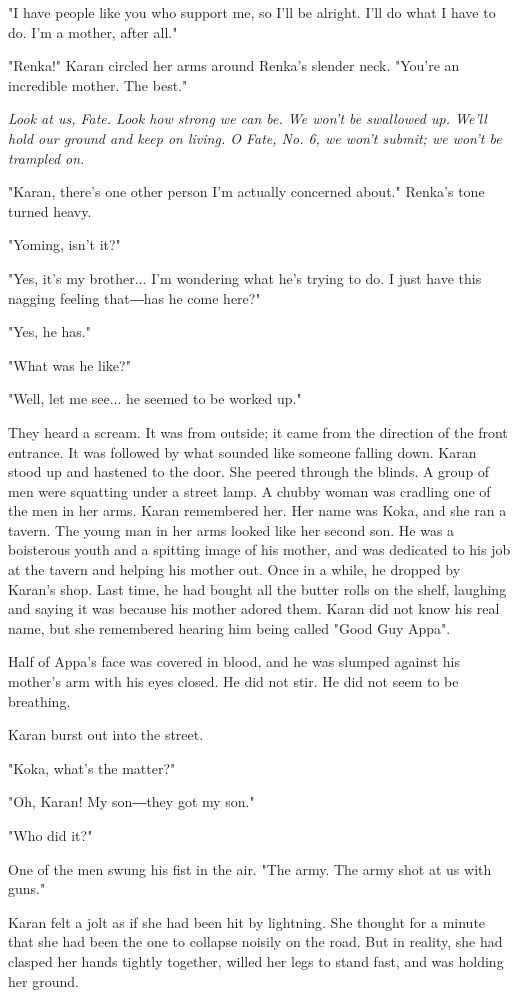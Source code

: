 "I have people like you who support me, so I'll be alright. I'll do what
I have to do. I'm a mother, after all."

"Renka!" Karan circled her arms around Renka's slender neck. "You're an
incredible mother. The best."

\emph{Look at us, Fate. Look how strong we can be. We won't be swallowed up.
	We'll hold our ground and keep on living. O Fate, No. 6, we won't
	submit; we won't be trampled on.}

"Karan, there's one other person I'm actually concerned about." Renka's
tone turned heavy.

"Yoming, isn't it?"

"Yes, it's my brother... I'm wondering what he's trying to do. I just
have this nagging feeling that―has he come here?"

"Yes, he has."

"What was he like?"

"Well, let me see... he seemed to be worked up."

They heard a scream. It was from outside; it came from the direction of
the front entrance. It was followed by what sounded like someone falling
down. Karan stood up and hastened to the door. She peered through the
blinds. A group of men were squatting under a street lamp. A chubby
woman was cradling one of the men in her arms. Karan remembered her. Her
name was Koka, and she ran a tavern. The young man in her arms looked
like her second son. He was a boisterous youth and a spitting image of
his mother, and was dedicated to his job at the tavern and helping his
mother out. Once in a while, he dropped by Karan's shop. Last time, he
had bought all the butter rolls on the shelf, laughing and saying it was
because his mother adored them. Karan did not know his real name, but
she remembered hearing him being called "Good Guy Appa".

Half of Appa's face was covered in blood, and he was slumped against his
mother's arm with his eyes closed. He did not stir. He did not seem to
be breathing.

Karan burst out into the street.

"Koka, what's the matter?"

"Oh, Karan! My son―they got my son."

"Who did it?"

One of the men swung his fist in the air. "The army. The army shot at us
with guns."

Karan felt a jolt as if she had been hit by lightning. She thought for a
minute that she had been the one to collapse noisily on the road. But in
reality, she had clasped her hands tightly together, willed her legs to
stand fast, and was holding her ground.

